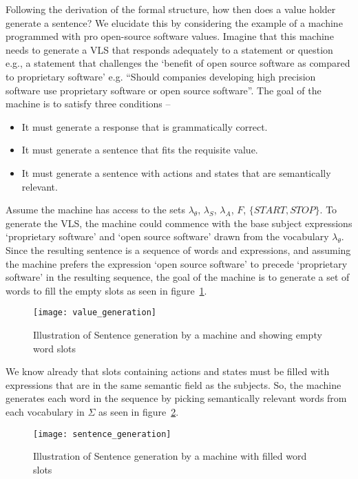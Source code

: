 Following the derivation of the formal structure, how then does a value holder generate a sentence? 
We elucidate this by considering the example of a machine programmed with pro open-source software values. Imagine that this machine needs to generate a VLS that responds adequately to a statement or question e.g., a statement that challenges the `benefit of open source software as compared to proprietary software' e.g. ``Should companies developing high precision software use proprietary software or open source software''. The goal of the machine is to satisfy three conditions -- 
\begin{itemize}
\item
It must generate a response that is grammatically correct. 
\item
It must generate a sentence that fits the requisite value.
\item
It must generate a sentence with actions and states that are semantically relevant.

\end{itemize} 
\noindent Assume the machine has access to the sets $\lambda_\theta$, $\lambda_S$, $\lambda_A$, $F$, $\{START,STOP\}$. To generate the VLS, the machine could commence with the base subject expressions `proprietary software' and `open source software' drawn from the vocabulary $\lambda_\theta$. Since the resulting sentence is a sequence of words and expressions, and assuming the machine prefers the expression `open source software' to precede `proprietary software' in the resulting sequence, the goal of the machine is to generate a set of words to fill the empty slots as seen in figure~\ref{fig:one}.
\begin{figure}
  \texttt{[image: value\_generation]}
  \caption{Illustration of Sentence generation by a machine and showing empty word slots}
  \label{fig:one}
\end{figure}

We know already that slots containing actions and states must be filled with expressions that are in the same semantic field as the subjects. So, the machine generates each word in the sequence by picking semantically relevant words from each vocabulary in $\Sigma$ as seen in figure~\ref{fig:two}.
\begin{figure}
  \texttt{[image: sentence\_generation]}
  \caption{Illustration of Sentence generation by a machine with filled word slots}
  \label{fig:two}
\end{figure}

